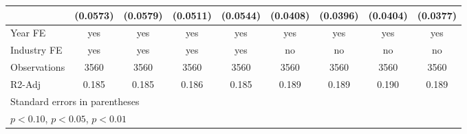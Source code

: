 \begin{table}[htbp]
\begin{tabular}{l*{8}{c}}
                    &    (0.0573)         &    (0.0579)         &    (0.0511)         &    (0.0544)         &    (0.0408)         &    (0.0396)         &    (0.0404)         &    (0.0377)         \\
\hline
Year FE             &         yes         &         yes         &         yes         &         yes         &         yes         &         yes         &         yes         &         yes         \\
Industry FE         &         yes         &         yes         &         yes         &         yes         &          no         &          no         &          no         &          no         \\
Observations        &        3560         &        3560         &        3560         &        3560         &        3560         &        3560         &        3560         &        3560         \\
R2-Adj              &       0.185         &       0.185         &       0.186         &       0.185         &       0.189         &       0.189         &       0.190         &       0.189         \\
\hline\hline
\multicolumn{9}{l}{\footnotesize Standard errors in parentheses}\\
\multicolumn{9}{l}{\footnotesize \sym{*} \(p<0.10\), \sym{**} \(p<0.05\), \sym{***} \(p<0.01\)}\\
\end{tabular}
\end{table}
